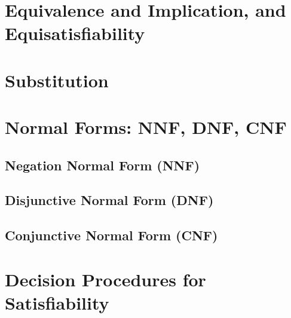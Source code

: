 
\cite{youtube:COSE419-Lecture4-1}
\cite{youtube:COSE419-Lecture4-2}
\cite{youtube:COSE419-Lecture4-3}

\section{Equivalence and Implication, and Equisatisfiability}

\section{Substitution}

\section{Normal Forms: NNF, DNF, CNF}

\subsection{Negation Normal Form (NNF)}
\subsection{Disjunctive Normal Form (DNF)}
\subsection{Conjunctive Normal Form (CNF)}

\section{Decision Procedures for Satisfiability}

%
%
%

